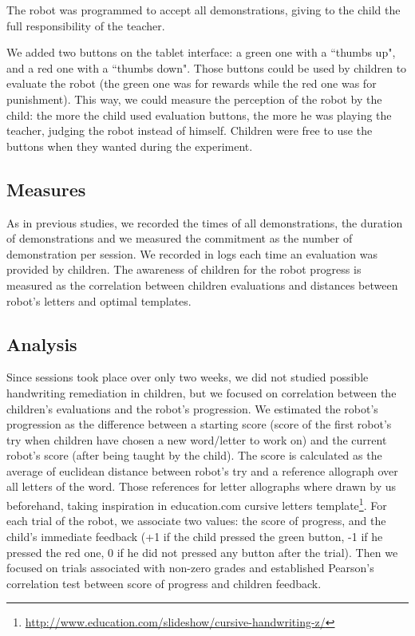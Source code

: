 \documentclass{sig-alternate}
\begin{document}
The robot was programmed to accept all demonstrations, giving to the child the
full responsibility of the teacher.

We added two buttons on the tablet  interface: a green one with a ``thumbs up", and
a red one with a ``thumbs down". Those buttons could be used by children to evaluate the
robot (the green one was for rewards while the red one was for punishment). This
way, we could measure the perception of the robot by the child: the more the
child used evaluation buttons, the more he was playing the teacher, judging the
robot instead of himself. Children were free to use the buttons when they wanted during the experiment. 


\subsection{Measures}

As in previous studies, we recorded the times of all demonstrations, the duration of demonstrations and we measured the commitment as the number of demonstration per session. 
We recorded in logs each time an evaluation was provided by children. The awareness of children for the robot progress is measured as the correlation between children evaluations and distances between robot's letters and optimal templates.

\subsection{Analysis}

Since sessions took place over only two weeks, we did not studied possible
handwriting remediation in children, but we focused on correlation between the children's evaluations and the robot's progression.
We estimated the robot's progression as the difference between a starting score
(score of the first robot's try when children have chosen a new word/letter to
work on) and the current robot's score (after being taught by the child). The
score is calculated as the average of euclidean
distance between robot's try and a reference allograph over all letters of the
word. Those references for letter allographs where drawn by us beforehand, taking inspiration in education.com cursive letters template\footnote{\url{http://www.education.com/slideshow/cursive-handwriting-z/}}. For each trial of the robot, we associate two values: the score of progress, and the child's immediate feedback (+1 if the child pressed the green button, -1 if he pressed the red one, 0 if he did not pressed any button after the trial). Then we focused on trials associated with non-zero grades and established Pearson's correlation test between score of progress and children feedback.
\end{document}
